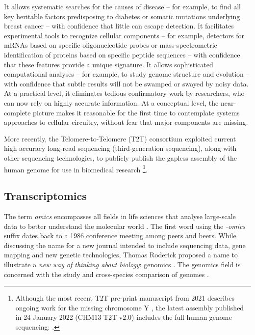 \begin{displayquote}
It allows systematic searches for the causes of disease -- for example, to find all key heritable factors predisposing to diabetes or somatic mutations underlying breast cancer -- with confidence that little can escape detection. It facilitates experimental tools to recognize cellular components -- for example, detectors for mRNAs based on specific oligonucleotide probes or mass-spectrometric identification of proteins based on specific peptide sequences -- with confidence that these features provide a unique signature. It allows sophisticated computational analyses -- for example, to study genome structure and evolution -- with confidence that subtle results will not be swamped or swayed by noisy data. At a practical level, it eliminates tedious confirmatory work by researchers, who can now rely on highly accurate information. At a conceptual level, the near-complete picture makes it reasonable for the first time to contemplate systems approaches to cellular circuitry, without fear that major components are missing.
\end{displayquote}

More recently, the Telomere-to-Telomere (T2T) consortium exploited current high accuracy long-read sequencing (third-generation sequencing), along with other sequencing technologies, to publicly publish the gapless assembly of the human genome for use in biomedical research \cite{nurk:2021up} \footnote{Although the most recent T2T pre-print manuscript from 2021 describes ongoing work for the missing chromosome Y \cite{nurk:2021up}, the latest assembly published in 24 January 2022 (CHM13 T2T v2.0) includes the full human genome sequencing: .}.

\subsection{Transcriptomics}

The term \emph{omics} encompasses all fields in life sciences that analyse large-scale data to better understand the molecular world \cite{yadav:2007uy}. The first word using the \emph{-omics} suffix dates back to a 1986 conference meeting among peers and beers. While discussing the name for a new journal intended to include sequencing data, gene mapping and new genetic technologies, Thomas Roderick proposed a name to illustrate a \emph{new way of thinking about biology}: genomics \cite{yadav:2007uy,kuska:1998ta}. The genomics field is concerned with the study and cross-species comparison of genomes \cite{kuska:1998ta}.

